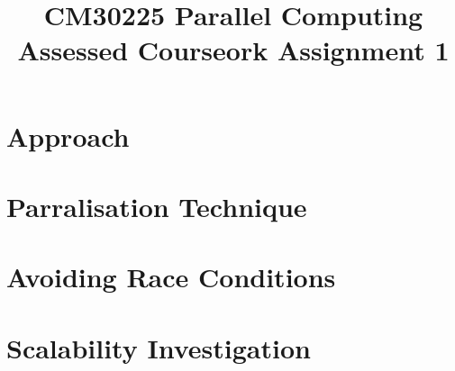 \documentclass{article}
\begin{document}
\title{CM30225 Parallel Computing \\ Assessed Courseork Assignment 1}
\author{}

\maketitle

\section{Approach}



\section{Parralisation Technique}

\section{Avoiding Race Conditions}

\section{Scalability Investigation}

\begin{figure}[H]
 \centering
 \caption{}
 \label{fig:speedup}
 \end{figure}\\~\\
\end{document}
